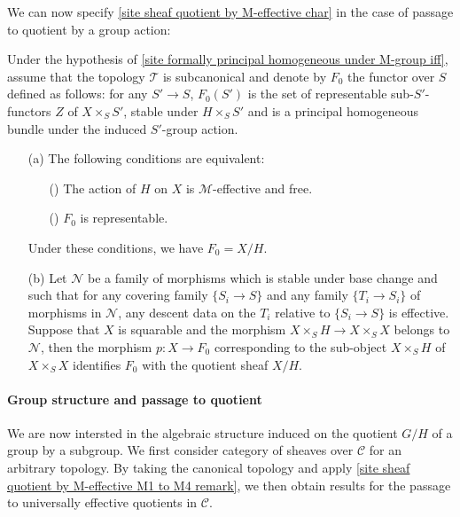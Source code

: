 We can now specify \cref{site sheaf quotient by M-effective char} in the case of passage to quotient by a group action:
\begin{proposition}\label{site sheaf quotient by M-effective free group action char}
Under the hypothesis of \cref{site formally principal homogeneous under M-group iff}, assume that the topology $\mathcal{T}$ is subcanonical and denote by $F_0$ the functor over $S$ defined as follows: for any $S'\to S$, $F_0(S')$ is the set of representable sub-$S'$-functors $Z$ of $X\times_SS'$, stable under $H\times_SS'$ and is a principal homogeneous bundle under the induced $S'$-group action.
\begin{enumerate}
    \item[(a)] The following conditions are equivalent:
    \begin{enumerate}
        \item[(\rmnum{1})] The action of $H$ on $X$ is $\mathcal{M}$-effective and free.
        \item[(\rmnum{2})] $F_0$ is representable.
    \end{enumerate}
    Under these conditions, we have $F_0=X/H$.
    \item[(b)] Let $\mathcal{N}$ be a family of morphisms which is stable under base change and such that for any covering family $\{S_i\to S\}$ and any family $\{T_i\to S_i\}$ of morphisms in $\mathcal{N}$, any descent data on the $T_i$ relative to $\{S_i\to S\}$ is effective. Suppose that $X$ is squarable and the morphism $X\times_SH\to X\times_SX$ belongs to $\mathcal{N}$, then the morphism $p:X\to F_0$ corresponding to the sub-object $X\times_SH$ of $X\times_SX$ identifies $F_0$ with the quotient sheaf $X/H$.
\end{enumerate}
\end{proposition}

\paragraph{Group structure and passage to quotient}
We are now intersted in the algebraic structure induced on the quotient $G/H$ of a group by a subgroup. We first consider category of sheaves over $\mathcal{C}$ for an arbitrary topology. By taking the canonical topology and apply \cref{site sheaf quotient by M-effective M1 to M4 remark}, we then obtain results for the passage to universally effective quotients in $\mathcal{C}$.

